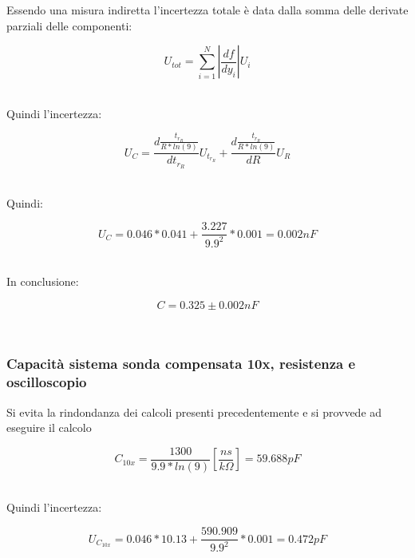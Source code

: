 \documentclass[a4paper]{article}
\begin{document}
Essendo una misura indiretta l'incertezza totale è data dalla somma delle derivate parziali delle componenti:
\begin{Large}
	\begin{equation}
		U_{tot}=\sum_{i=1}^{N}|{\frac{df}{dy_i}}| U_i
	\end{equation}
\end{Large}\\

Quindi l'incertezza:
\begin{Large}
	\begin{equation}
		{U_C}= \frac{d\frac{t_{r_R}}{R*ln(9)}}{dt_{r_R}}U_{t_{r_R}}+\frac{d\frac{t_{r_R}}{R*ln(9)}}{dR}U_{R}
	\end{equation}
\end{Large}\\

Quindi:
\begin{Large}
	\begin{equation}
		{U_C}= 0.046*0.041+\frac{3.227}{9.9^2}*0.001=0.002 nF
	\end{equation}
\end{Large}\\

In conclusione: 
\begin{Large}
	\begin{equation}
		C=0.325\pm 0.002nF
	\end{equation}
\end{Large}\\

\subsubsection{Capacità sistema sonda compensata 10x, resistenza e oscilloscopio }
Si evita la rindondanza dei calcoli presenti precedentemente e si provvede ad eseguire il calcolo
\begin{Large}
	\begin{equation}
  		C_{10x}= \frac{1300}{9.9*ln(9)} [\frac{ns}{k\Omega}]= 59.688pF
	\end{equation}
\end{Large}\\

Quindi l'incertezza:
\begin{Large}
	\begin{equation}
		{U_{C_{10x}}}= 0.046*10.13+\frac{590.909}{9.9^2}*0.001=0.472 pF
	\end{equation}
\end{Large}\\
\end{document}
